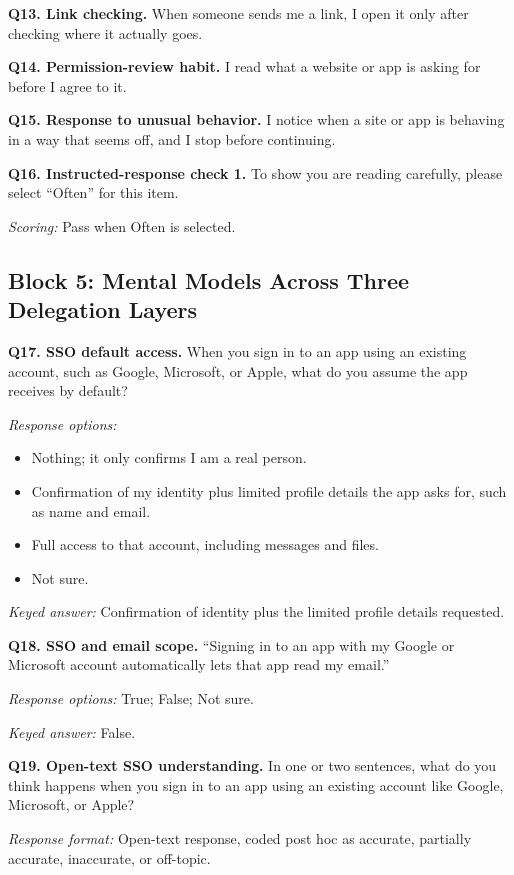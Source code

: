 \documentclass[11pt]{article}
\begin{document}
\textbf{Q13. Link checking.}
When someone sends me a link, I open it only after checking where it actually
goes.

\textbf{Q14. Permission-review habit.}
I read what a website or app is asking for before I agree to it.

\textbf{Q15. Response to unusual behavior.}
I notice when a site or app is behaving in a way that seems off, and I stop
before continuing.

\textbf{Q16. Instructed-response check 1.}
To show you are reading carefully, please select ``Often'' for this item.

\textit{Scoring:} Pass when Often is selected.

\subsection*{Block 5: Mental Models Across Three Delegation Layers}

\textbf{Q17. SSO default access.}
When you sign in to an app using an existing account, such as Google,
Microsoft, or Apple, what do you assume the app receives by default?

\textit{Response options:}
\begin{itemize}[leftmargin=1.6em]
  \item Nothing; it only confirms I am a real person.
  \item Confirmation of my identity plus limited profile details the app asks
        for, such as name and email.
  \item Full access to that account, including messages and files.
  \item Not sure.
\end{itemize}

\textit{Keyed answer:} Confirmation of identity plus the limited profile
details requested.

\textbf{Q18. SSO and email scope.}
``Signing in to an app with my Google or Microsoft account automatically lets
that app read my email.''

\textit{Response options:} True; False; Not sure.

\textit{Keyed answer:} False.

\textbf{Q19. Open-text SSO understanding.}
In one or two sentences, what do you think happens when you sign in to an app
using an existing account like Google, Microsoft, or Apple?

\textit{Response format:} Open-text response, coded post hoc as accurate,
partially accurate, inaccurate, or off-topic.
\end{document}

